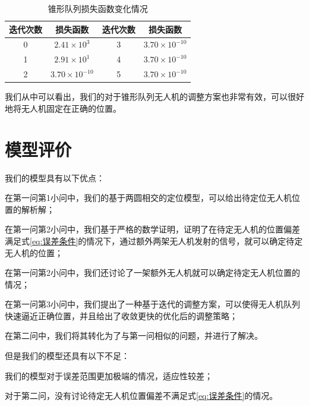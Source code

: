 \documentclass[12pt,AutoFakeSlant,AutoFakeBold]{article}
\begin{document}
\begin{table}[!ht]
    \centering
    \caption{锥形队列损失函数变化情况}
    \label{tab:损失函数变化_锥形}
    \begin{tabular}{cc|cc}
        \toprule
        迭代次数 & 损失函数 & 迭代次数 & 损失函数 \\
        \midrule
        0 & $2.41\times 10^3$ & 3 & $3.70\times 10^{-10}$ \\ 
        1 & $2.91\times 10^1$ & 4 & $3.70\times 10^{-10}$ \\ 
        2 & $3.70\times 10^{-10}$ & 5 & $3.70\times 10^{-10}$ \\ 
        \bottomrule
    \end{tabular}
\end{table}

我们从中可以看出，我们的对于锥形队列无人机的调整方案也非常有效，可以很好地将无人机固定在正确的位置。


\section{模型评价}

我们的模型具有以下优点：
\begin{itemize*}
    \item 在第一问第1小问中，我们的基于两圆相交的定位模型，可以给出待定位无人机位置的解析解；
    \item 在第一问第2小问中，我们基于严格的数学证明，证明了在待定无人机的位置偏差满足式\ref{eq:误差条件}的情况下，通过额外两架无人机发射的信号，就可以确定待定无人机的位置；
    \item 在第一问第2小问中，我们还讨论了一架额外无人机就可以确定待定无人机位置的情况；
    \item 在第一问第3小问中，我们提出了一种基于迭代的调整方案，可以使得无人机队列快速逼近正确位置，并且给出了收敛更快的优化后的调整策略；
    \item 在第二问中，我们将其转化为了与第一问相似的问题，并进行了解决。
\end{itemize*}

但是我们的模型还具有以下不足：
\begin{itemize*}
    \item 我们的模型对于误差范围更加极端的情况，适应性较差；
    \item 对于第二问，没有讨论待定无人机位置偏差不满足式\ref{eq:误差条件}的情况。
\end{itemize*}
\end{document}
